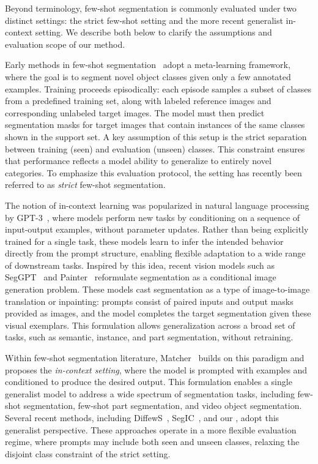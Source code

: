 Beyond terminology, few-shot segmentation is commonly evaluated under two distinct settings: the strict few-shot setting and the more recent generalist in-context setting. We describe both below to clarify the assumptions and evaluation scope of our method.


Early methods in few-shot segmentation~\cite{li2021adaptive, wang2019panet, lang2022learning, liu2022learning, fan2022self, wang2020few, zhang2021few, moon2023msi, Min_2021_ICCV, hong2022cost} adopt a meta-learning framework, where the goal is to segment novel object classes given only a few annotated examples. Training proceeds episodically: each episode samples a subset of classes from a predefined training set, along with labeled reference images and corresponding unlabeled target images. The model must then predict segmentation masks for target images that contain instances of the same classes shown in the support set. A key assumption of this setup is the strict separation between training (seen) and evaluation (unseen) classes. This constraint ensures that performance reflects a model ability to generalize to entirely novel categories. To emphasize this evaluation protocol, the setting has recently been referred to \cite{zhu2024unleashing, meng2024segic} as \textit{strict} few-shot segmentation.

The notion of in-context learning was popularized in natural language processing by GPT-3~\cite{brown2020language}, where models perform new tasks by conditioning on a sequence of input-output examples, without parameter updates. Rather than being explicitly trained for a single task, these models learn to infer the intended behavior directly from the prompt structure, enabling flexible adaptation to a wide range of downstream tasks. Inspired by this idea, recent vision models such as SegGPT~\cite{wang2023seggpt} and Painter~\cite{wang2023images} reformulate segmentation as a conditional image generation problem. These models cast segmentation as a type of image-to-image translation or inpainting: prompts consist of paired inputs and output masks provided as images, and the model completes the target segmentation given these visual exemplars. This formulation allows generalization across a broad set of tasks, such as semantic, instance, and part segmentation, without retraining.

Within few-shot segmentation literature, Matcher~\cite{liu2023matcher} builds on this paradigm and proposes the \textit{in-context setting}, where the model is prompted with examples and conditioned to produce the desired output. This formulation enables a single generalist model to address a wide spectrum of segmentation tasks, including few-shot segmentation, few-shot part segmentation, and video object segmentation. Several recent methods, including DiffewS~\cite{zhu2024unleashing}, SegIC~\cite{meng2024segic}, and our \ours{}, adopt this generalist perspective. These approaches operate in a more flexible evaluation regime, where prompts may include both seen and unseen classes, relaxing the disjoint class constraint of the strict setting.


